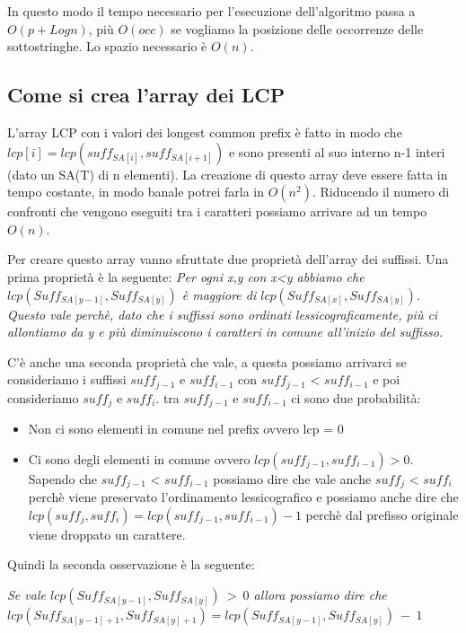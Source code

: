 \documentclass[14pt]{extreport}
\begin{document}
In questo modo il tempo necessario per l'esecuzione dell'algoritmo passa a $O(p+Logn)$, più $O(occ)$ se vogliamo la posizione delle occorrenze delle sottostringhe. Lo spazio necessario è $O(n)$.


\subsection{Come si crea l'array dei LCP}

L'array LCP con i valori dei longest common prefix è fatto in modo che $lcp[i]=lcp(suff_{SA[i]}, suff_{SA[i+1]})$ e sono presenti al suo interno n-1 interi (dato un SA(T) di n elementi).
La creazione di questo array deve essere fatta in tempo costante, in modo banale potrei farla in $O(n^2)$.
Riducendo il numero di confronti che vengono eseguiti tra i caratteri possiamo arrivare ad un tempo $O(n)$.

Per creare questo array vanno sfruttate due proprietà dell'array dei suffissi.
Una prima proprietà è la seguente:
\newline
\textit{Per ogni x,y con x<y abbiamo che $lcp(Suff_{SA[y-1]}, Suff_{SA[y]})$ è maggiore di $lcp(Suff_{SA[x]}, Suff_{SA[y]})$. Questo vale perchè, dato che i suffissi sono ordinati lessicograficamente, più ci allontiamo da y e più diminuiscono i caratteri in comune all'inizio del suffisso.}

C'è anche una seconda proprietà che vale, a questa possiamo arrivarci se consideriamo i suffissi $suff_{j-1}$ e $suff_{i-1}$ con $suff_{j-1}$ < $suff_{i-1}$ e poi consideriamo  $suff_{j}$ e $suff_{i}$.
tra $suff_{j-1}$ e $suff_{i-1}$ ci sono due probabilità:
\begin{itemize}
\item Non ci sono elementi in comune nel prefix ovvero lcp = 0
\item Ci sono degli elementi in comune ovvero $lcp(suff_{j-1}, suff_{i-1}) > 0$. Sapendo che $suff_{j-1}$ < $suff_{i-1}$ possiamo dire che vale anche $suff_{j}$ < $suff_{i}$ perchè viene preservato l'ordinamento lessicografico e possiamo anche dire che $lcp(suff_{j}, suff_{i}) = lcp(suff_{j-1}, suff_{i-1}) - 1$ perchè dal prefisso originale viene droppato un carattere. 
\end{itemize}

Quindi la seconda osservazione è la seguente:

\textit{Se vale $lcp(Suff_{SA[y-1]}, Suff_{SA[y]})\ >\ 0$ allora possiamo dire che \newline $lcp(Suff_{SA[y-1]+1}, Suff_{SA[y]+1}) = lcp(Suff_{SA[y-1]}, Suff_{SA[y]})\ -\ 1$ }
\end{document}
